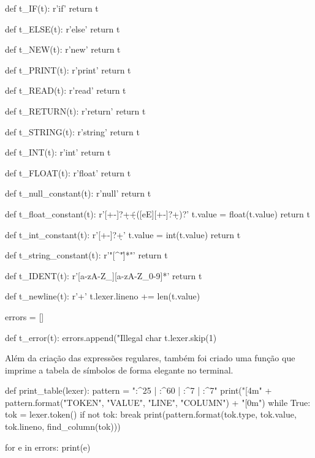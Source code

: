 \documentclass[
	12pt,				%
	openright,			%
	twoside,			%
	a4paper,			%
	english,			%
	french,				%
	spanish,			%
	brazil				%
	]{abntex2}
\begin{document}
\begin{python}
def t_IF(t):
    r'if'
    return t

def t_ELSE(t):
    r'else'
    return t

def t_NEW(t):
    r'new'
    return t

def t_PRINT(t):
    r'print'
    return t

def t_READ(t):
    r'read'
    return t

def t_RETURN(t):
    r'return'
    return t

def t_STRING(t):
    r'string'
    return t

def t_INT(t):
    r'int'
    return t

def t_FLOAT(t):
    r'float'
    return t
\end{python}

\begin{python}
def t_null_constant(t):
    r'null'
    return t

def t_float_constant(t):
    r'[+-]?\d+\.\d+([eE][+-]?\d+)?'
    t.value = float(t.value)
    return t
\end{python}
\newpage
\begin{python}
def t_int_constant(t):
    r'[+-]?\d+'
    t.value = int(t.value)
    return t

def t_string_constant(t):
    r'"[^"\n\r]*"'
    return t

def t_IDENT(t):
    r'[a-zA-Z_][a-zA-Z_0-9]*'
    return t

def t_newline(t):
    r'\n+'
    t.lexer.lineno += len(t.value)

errors = []

def t_error(t):
    errors.append("Illegal char %
    t.lexer.skip(1)
\end{python}

Além da criação das expressões regulares, também foi criado uma função que imprime 
a tabela de símbolos de forma elegante no terminal.
\\
\begin{python}
def print_table(lexer):
    pattern = "{:^25} | {:^60} | {:^7} | {:^7}"
    print("[4m" + pattern.format("TOKEN", "VALUE", "LINE", "COLUMN") + "[0m")
    while True:
        tok = lexer.token()
        if not tok:
            break
        print(pattern.format(tok.type, tok.value, tok.lineno, find_column(tok))) 

    for e in errors:
        print(e)

\end{python}
\newpage
\end{document}

